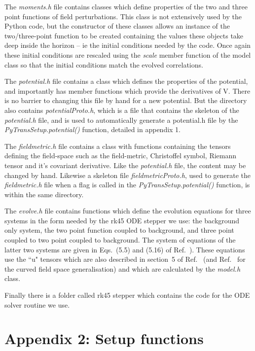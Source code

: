 \documentclass[10pt,
amsmath,amssymb,
aps,prd,nofootinbib,eqsecnum,a4paper]{revtex4}
\begin{document}
The {\it moments.h} file contains classes which define properties of the two and three point functions of field perturbations. 
This class is not extensively used by the Python code, but the constructor of these classes allows an instance of the 
two/three-point function to be created containing the values these objects take deep inside the horizon -- ie the initial 
conditions needed by the code. 
Once again these initial conditions are rescaled using the {\it scale} member function of the model class so that the initial 
conditions match the evolved 
correlations.

The {\it potential.h} file contains a class which defines the properties of the potential, and importantly has member functions which provide the derivatives of V. There is no barrier to changing this file by hand for a new potential. But the directory also contains {\it potentialProto.h}, which is a file that contains the skeleton of the {\it potential.h} file, and is used to automatically generate a potential.h file by the {\it PyTransSetup.potential()} function, detailed in appendix 1. 

The {\it fieldmetric.h} file contains a class with functions containing the tensors defining the field-space such as the field-metric, Christoffel symbol, Riemann tensor and it's covariant derivative. Like the {\it potential.h} file, the content may be changed by hand. Likewise a skeleton file {\it fieldmetricProto.h}, used to generate the {\it fieldmetric.h} file when a flag is called in the {\it PyTransSetup.potential()} function, is within the same directory.

The {\it evolve.h} file contains functions which define the evolution equations for three systems in the form needed 
by the rk45 ODE stepper we use: the background only system, the two point function  
coupled to background, and three point coupled to two point coupled to background. The system of equations of the latter two systems 
are given 
in Eqs.~(5.5) and (5.16) of Ref.~\cite{Dias:2016rjq}). These equations use the ``u" tensors which are also described in 
section~5 of Ref.~\cite{Dias:2016rjq} (and Ref.~\cite{xxx2} for the curved field space generalisation) and 
which are calculated by the {\it model.h} class.  

Finally there is a folder called rk45 stepper
which contains the code for the ODE solver routine we use.


\section*{Appendix 2: Setup functions}
\end{document}
